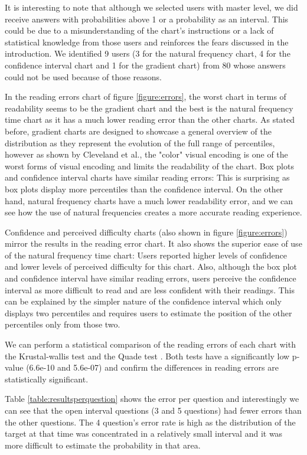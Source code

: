 \documentclass[a4paper,3p,sort&compress]{elsarticle}
\begin{document}
It is interesting to note that although we selected users with master level, we did receive answers with probabilities
above 1 or a probability as an interval. This could be due to a misunderstanding of the chart's instructions or
a lack of statistical knowledge from those
users and reinforces the fears discussed in the introduction. We identified 9 users (3 for the natural frequency chart,
4 for the confidence interval chart and 1 for the gradient chart)
 from 80 whose answers could not be used because of those reasons.

In the reading errors chart of figure \ref{figure:errors}, the worst chart in terms of readability seems to be the
gradient chart and the best is the natural frequency time chart as it has a much lower reading error than the other charts. As stated before,
gradient charts are designed to showcase a general overview of the distribution as they represent the evolution of the
full range of percentiles, however as shown by Cleveland et al., the "color" visual encoding is one of the
worst forms of visual encoding and limits the readability of the chart. Box plots and confidence interval charts have similar reading errors: This is surprising
as box plots display more percentiles than the confidence interval. On the other hand, natural
frequency charts have a much lower readability error, and we can see how the use of natural frequencies creates a more accurate reading experience.

Confidence and perceived difficulty charts (also shown in figure \ref{figure:errors}) mirror the results in the reading error chart.
It also shows the superior ease of use
of the natural frequency time chart: Users reported higher levels of confidence and
lower levels of perceived difficulty for this chart. Also, although the box plot and confidence interval have similar reading errors,
users perceive the confidence interval as more difficult to read and are less confident with their readings. This can be explained by
the simpler nature of the confidence interval which only displays two percentiles and requires users to estimate the position of the other
percentiles only from those two.

We can perform a statistical comparison of the reading errors of each chart with the Krustal-wallis test \cite{krustal} and
the Quade test \cite{quade_rank_1967}. Both tests have a
significantly low p-value (6.6e-10 and 5.6e-07) and confirm the differences in reading errors are statistically significant.

Table \ref{table:resultsperquestion} shows the error per question and interestingly we can see that the open interval questions (3 and 5 questions)
had fewer errors than the other questions. The 4 question's error rate is high as the distribution of the target
at that time was concentrated in a relatively
small interval and it was more difficult to estimate the probability in that area.
\end{document}
